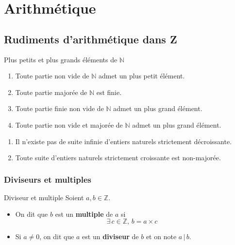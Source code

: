 \chapter{Arithmétique}
\chaptertoc

\section{Rudiments d’arithmétique dans Z}

    \begin{theo}{Plus petits et plus grands éléments de $\mathbb{N}$}{}
        \begin{enumerate}[label=(\roman*)]
            \item Toute partie non vide de $\mathbb{N}$ admet un plus petit élément.
            \item Toute partie majorée de $\mathbb{N}$ est finie.
            \item Toute partie finie non vide de $\mathbb{N}$ admet un plus grand élément.
            \item Toute partie non vide et majorée de $\mathbb{N}$ admet un plus grand élément.
    \end{enumerate}
    \end{theo}

    \begin{coro}{}{}
        \begin{enumerate}[label=(\roman*)]
        
        \item Il n’existe pas de suite infinie d’entiers naturels strictement décroissante.
        \item Toute suite d’entiers naturels strictement croissante est non-majorée.
        
        \end{enumerate}
    \end{coro}

\subsection{Diviseurs et multiples}

    \begin{defi}{Diviseur et multiple}{}
	Soient $a,b \in \mathbb{Z}$.
	    \begin{itemize}
		    \item On dit que $b$ est un \textbf{multiple} de $a$ si \[ \exists \, c \in \mathbb{Z}, \, b = a \times c \]
		    \item Si $a \neq 0$, on dit que $a$ est un \textbf{diviseur} de $b$ et on note $a \, | \, b$.
	    \end{itemize}
    \end{defi}

